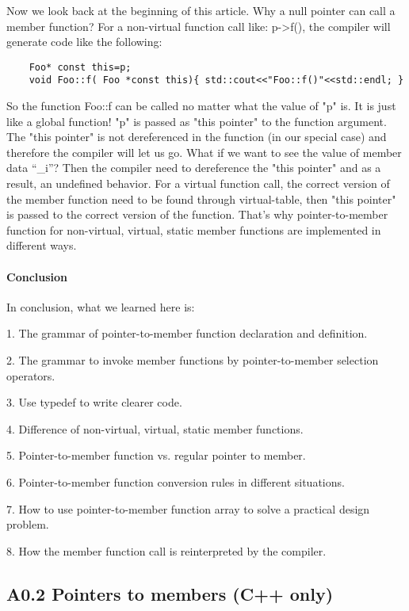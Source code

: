 \documentclass{book}
\begin{document}
Now we look back at the beginning of this article.
Why a null pointer can call a member function? For a non-virtual function call like: p->f(), the compiler will generate code like the following:

\begin{lstlisting}
    Foo* const this=p;
    void Foo::f( Foo *const this){ std::cout<<"Foo::f()"<<std::endl; }
\end{lstlisting}
So the function Foo::f can be called no matter what the value of "p" is. It is just like a global function!
"p" is passed as "this pointer" to the function argument. 
The "this pointer" is not dereferenced in the function (in our special case) and therefore the compiler will let us go.
What if we want to see the value of member data ``\_i''? 
Then the compiler need to dereference the "this pointer" and as a result, an undefined behavior.
For a virtual function call, the correct version of the member function need to be found through virtual-table,
then "this pointer" is passed to the correct version of the function. That's why pointer-to-member function for non-virtual, virtual, static member functions are implemented in different ways.

\paragraph{Conclusion}

In conclusion, what we learned here is:

1. The grammar of pointer-to-member function declaration and definition.

2. The grammar to invoke member functions by pointer-to-member selection operators.

3. Use typedef to write clearer code.

4. Difference of non-virtual, virtual, static member functions.

5. Pointer-to-member function vs. regular pointer to member.

6. Pointer-to-member function conversion rules in different situations.

7. How to use pointer-to-member function array to solve a practical design problem.

8. How the member function call is reinterpreted by the compiler.
\subsection{A0.2 Pointers to members (C++ only)}
\end{document}
